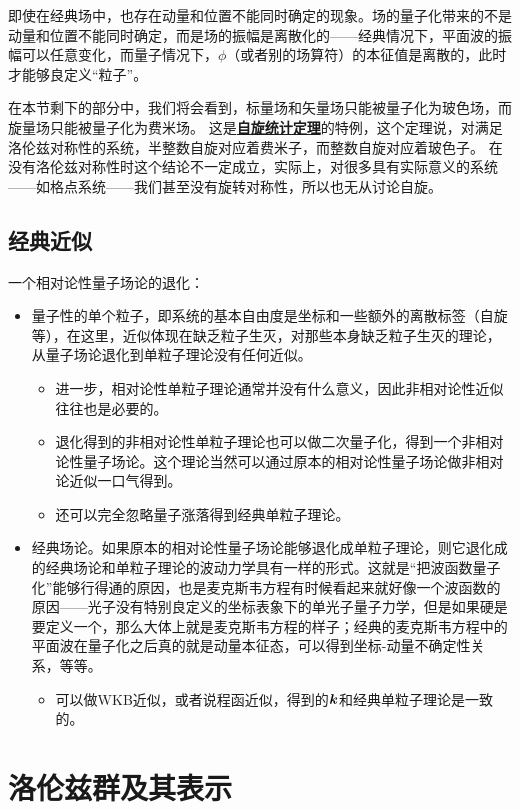 \documentclass[hyperref, UTF8, a4paper]{ctexart}
\newcommand{\concept}[1]{\underline{\textbf{#1}}}
\begin{document}
即使在经典场中，也存在动量和位置不能同时确定的现象。场的量子化带来的不是动量和位置不能同时确定，而是场的振幅是离散化的——经典情况下，平面波的振幅可以任意变化，而量子情况下，${\phi}$（或者别的场算符）的本征值是离散的，此时才能够良定义“粒子”。

在本节剩下的部分中，我们将会看到，标量场和矢量场只能被量子化为玻色场，而旋量场只能被量子化为费米场。
这是\concept{自旋统计定理}的特例，这个定理说，对满足洛伦兹对称性的系统，半整数自旋对应着费米子，而整数自旋对应着玻色子。
在没有洛伦兹对称性时这个结论不一定成立，实际上，对很多具有实际意义的系统——如格点系统——我们甚至没有旋转对称性，所以也无从讨论自旋。

\subsection{经典近似}

一个相对论性量子场论的退化：
\begin{itemize}
    \item 量子性的单个粒子，即系统的基本自由度是坐标和一些额外的离散标签（自旋等），在这里，近似体现在缺乏粒子生灭，对那些本身缺乏粒子生灭的理论，从量子场论退化到单粒子理论没有任何近似。
    \begin{itemize}
        \item 进一步，相对论性单粒子理论通常并没有什么意义，因此非相对论性近似往往也是必要的。
        \item 退化得到的非相对论性单粒子理论也可以做二次量子化，得到一个非相对论性量子场论。这个理论当然可以通过原本的相对论性量子场论做非相对论近似一口气得到。
        \item 还可以完全忽略量子涨落得到经典单粒子理论。
    \end{itemize}
    \item 经典场论。如果原本的相对论性量子场论能够退化成单粒子理论，则它退化成的经典场论和单粒子理论的波动力学具有一样的形式。这就是“把波函数量子化”能够行得通的原因，也是麦克斯韦方程有时候看起来就好像一个波函数的原因——光子没有特别良定义的坐标表象下的单光子量子力学，但是如果硬是要定义一个，那么大体上就是麦克斯韦方程的样子；经典的麦克斯韦方程中的平面波在量子化之后真的就是动量本征态，可以得到坐标-动量不确定性关系，等等。
    \begin{itemize}
        \item 可以做WKB近似，或者说程函近似，得到的$\vb*{k}$和经典单粒子理论是一致的。
    \end{itemize}
\end{itemize}

\section{洛伦兹群及其表示}\label{sec:symmetry}
\end{document}
